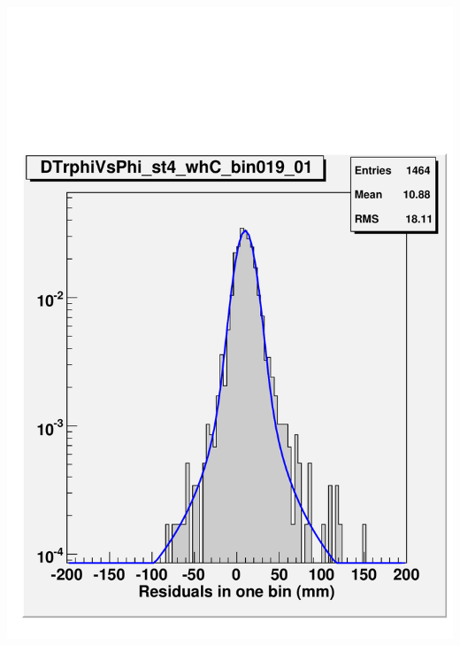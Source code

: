 \documentclass[compress]{beamer}
\begin{document}
\begin{frame}
\begin{columns}

\includegraphics[width=\linewidth]{fitfunction.pdf}


\end{columns}
\end{frame}
\end{document}

